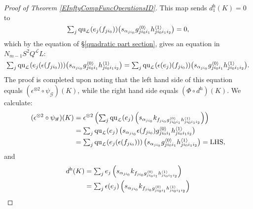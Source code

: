 \documentclass[11pt]{amsart} \renewcommand{\baselinestretch}{1.2}
\theoremstyle{plain}
\numberwithin{equation}{section} %
\theoremstyle{plain}
\numberwithin{equation}{chapter} %
\newcommand{\scrG}{\mathscr{G}}
\newcommand{\calL}{\mathcal{L}}
\newcommand{\call}{\mathcal{L}}
\newcommand{\BSW}{{\scrG}}
\newcommand{\quadratic}{\mathrm{qu}}
\newcommand{\uhor}{^\mathrm{h}}
\begin{document}
\begin{Operations in composite functor spectral sequences}
\begin{proof}[Proof of Theorem \ref{EInftyCompFuncOperationsID}]
This map sends $d\uhor_1(K)=0$ to %
\[
\textstyle\sum_j {\quadratic_\call}(e_j(f_{ji_0}))\smash{\left(s_{\alpha_{ji_0}} {g^{\smash{\langle} 0\smash{\rangle}}_{ji_0i_1}h^{\smash{\langle} 1\smash{\rangle}}_{ji_0i_1i_2}}\right)}=0, \]
which by the equation of \S\ref{quadratic part section}, gives an equation in $N_{m-1}S^2Q^{\calL}L$:
\[\textstyle\sum_j {\quadratic_\call}(e_j(\epsilon (f_{ji_0})))\smash{\left(s_{\alpha_{ji_0}} {g^{\smash{\langle} 0\smash{\rangle}}_{ji_0i_1}h^{\smash{\langle} 1\smash{\rangle}}_{ji_0i_1i_2}}\right)}
=
\textstyle\sum_j {\quadratic_\call}(\epsilon (e_j)(f_{ji_0}))\smash{\left(s_{\alpha_{ji_0}} {g^{\smash{\langle} 0\smash{\rangle}}_{ji_0i_1}h^{\smash{\langle} 1\smash{\rangle}}_{ji_0i_1i_2}}\right)}.
\]
The proof is completed upon noting that the left hand side of this equation equals $(\epsilon^{\otimes 2}\circ \psi_\BSW)(K)$, while the right hand side equals $(\Phi\circ d\uhor)(K)$. We calculate:
\begin{alignat*}{2}
(\epsilon^{\otimes 2}\circ \psi_\BSW)(K)
&=
\epsilon^{\otimes 2}\left(\textstyle\sum_j {\quadratic_\call}(e_j)\left(s_{\alpha_{ji_0}} k_{f\relax _{ji_0}g^{\smash{\langle} 0\smash{\rangle}}_{ji_0i_1}h^{\smash{\langle} 1\smash{\rangle}}_{ji_0i_1i_2}}\right)\right)%
\\
&=
\textstyle\sum_j {\quadratic_\call}(e_j)\left(s_{\alpha_{ji_0}} \epsilon(f\relax _{ji_0})g^{\smash{\langle} 0\smash{\rangle}}_{ji_0i_1}h^{\smash{\langle} 1\smash{\rangle}}_{ji_0i_1i_2}\right)%
\\
&=
\textstyle\sum_j {\quadratic_\call}(e_j(\epsilon (f_{ji_0})))\left(s_{\alpha_{ji_0}} g^{\smash{\langle} 0\smash{\rangle}}_{ji_0i_1}h^{\smash{\langle} 1\smash{\rangle}}_{ji_0i_1i_2}\right)=\textup{LHS},
\end{alignat*}
and
\begin{alignat*}{2}
d\uhor(K)
&=
\textstyle\sum_j e_j\left(s_{\alpha_{ji_0}} k_{f\relax _{ji_0}g^{\smash{\langle} 0\smash{\rangle}}_{ji_0i_1}h^{\smash{\langle} 1\smash{\rangle}}_{ji_0i_1i_2}}\right)%
\\
&=
\textstyle\sum_j \epsilon (e_j)\left(s_{\alpha_{ji_0}} k_{f\relax _{ji_0}g^{\smash{\langle} 0\smash{\rangle}}_{ji_0i_1}h^{\smash{\langle} 1\smash{\rangle}}_{ji_0i_1i_2}}\right)%

\end{alignat*}
\end{proof}
\end{Operations in composite functor spectral sequences}
\end{document}
